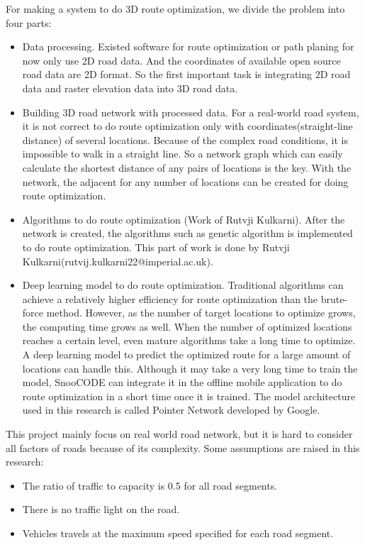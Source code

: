 \documentclass[final-report]{report-template}
\begin{document}
For making a system to do 3D route optimization, we divide the problem into four parts: 
\begin{itemize}
    \item Data processing. Existed software for route optimization or path planing for now only use 2D road data.
          And the coordinates of available open source road data are 2D format.
          So the first important task is integrating 2D road data and raster elevation data into 3D road data.
    \item Building 3D road network with processed data. 
          For a real-world road system, it is not correct to do route optimization only with coordinates(straight-line distance) of several locations.
          Because of the complex road conditions, it is impossible to walk in a straight line.
          So a network graph which can easily calculate the shortest distance of any pairs of locations is the key.
          With the network, the adjacent for any number of locations can be created for doing route optimization.
    \item Algorithms to do route optimization (Work of Rutvji Kulkarni). 
          After the network is created, the algorithms such as genetic algorithm is implemented to do route optimization.
          This part of work is done by Rutvji Kulkarni(rutvij.kulkarni22@imperial.ac.uk).
    \item Deep learning model to do route optimization. 
          Traditional algorithms can achieve a relatively higher efficiency for route optimization than the brute-force method.
          However, as the number of target locations to optimize grows, the computing time grows as well.
          When the number of optimized locations reaches a certain level, even mature algorithms take a long time to optimize.
          A deep learning  model to predict the optimized route for a large amount of locations can handle this.
          Although it may take a very long time to train the model, 
          SnooCODE can integrate it in the offline mobile application to do route optimization in a short time once it is trained.
          The model architecture used in this research is called Pointer Network developed by Google.
\end{itemize}

This project mainly focus on real world road network, 
but it is hard to consider all factors of roads because of its complexity.
Some assumptions are raised in this research:
\begin{itemize}
    \item The ratio of traffic to capacity is 0.5 for all road segments.
    \item There is no traffic light on the road.
    \item Vehicles travels at the maximum speed specified for each road segment.
\end{itemize}
\end{document}
